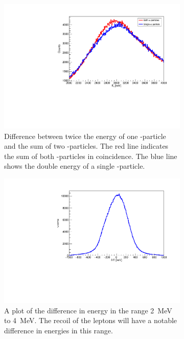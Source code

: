 \begin{figure}
	\begin{subfigure}[t]{.5\linewidth}
		\centering
		\includegraphics[width=\linewidth]{../figures/recoil.pdf}
		\caption{Difference between twice the energy of one \al-particle and the sum of two \al-particles. The red line indicates the sum of both \al-particles in coincidence. The blue line shows the double energy of a single \al-particle.}
		\label{fig:recoil}
	\end{subfigure}
	\begin{subfigure}[t]{.5\linewidth}
		\centering
		\includegraphics[width=\linewidth]{../figures/recoilGauss.pdf}
		\caption{A plot of the difference in energy in the range \SI{2}{MeV} to \SI{4}{MeV}. The recoil of the leptons will have a notable difference in energies in this range.}
		\label{fig:recoilGauss}
	\end{subfigure}
\caption{}
\end{figure}

